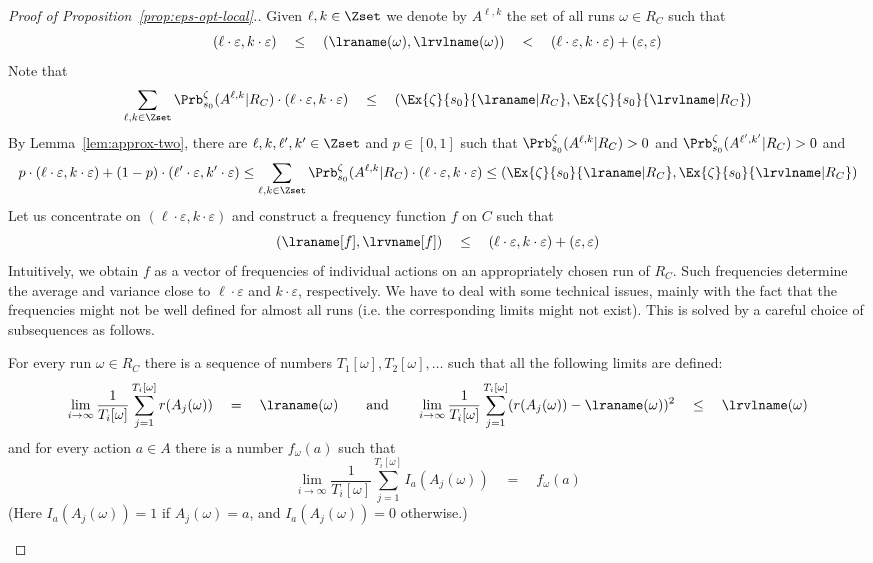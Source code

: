 \medskip\noindent
\begin{proof}[Proof of Proposition~\ref{prop:eps-opt-local}.]
Given $\ell,k\in \Zset$ we denote by $A^{\ell,k}$ the set of all runs $\omega\in R_C$ such that
\[
(\ell\cdot \varepsilon,k\cdot \varepsilon) \quad \leq \quad (\lraname(\omega),\lrvlname(\omega))\quad < \quad (\ell\cdot \varepsilon,k\cdot \varepsilon)+(\varepsilon,\varepsilon)
\]
Note that 
\[
\sum_{\ell,k\in \Zset} \Prb_{s_0}^{\zeta}(A^{\ell,k}|R_C)\cdot (\ell\cdot \varepsilon,k\cdot \varepsilon) \quad \leq \quad
(\Ex{\zeta}{s_0}{\lraname|R_C}, \Ex{\zeta}{s_0}{\lrvlname|R_C})
\]
By Lemma~\ref{lem:approx-two}, there are $\ell,k,\ell',k'\in \Zset$ and $p\in [0,1]$ such that $\Prb_{s_0}^{\zeta}(A^{\ell,k}|R_C)>0$ and $\Prb_{s_0}^{\zeta}(A^{\ell',k'}|R_C)>0$ and 
\begin{equation}\label{eq:approx-two}
p\cdot (\ell\cdot \varepsilon,k\cdot \varepsilon)+(1-p)\cdot (\ell'\cdot \varepsilon,k'\cdot \varepsilon)\leq \sum_{\ell,k\in \Zset} \Prb_{s_0}^{\zeta}(A^{\ell,k}|R_C)\cdot (\ell\cdot \varepsilon,k\cdot \varepsilon)\leq
(\Ex{\zeta}{s_0}{\lraname|R_C}, \Ex{\zeta}{s_0}{\lrvlname|R_C})
\end{equation}
Let us concentrate on $(\ell\cdot \varepsilon,k\cdot \varepsilon)$ and construct a frequency function $f$ on $C$ such that
\[
 (\lraname[f],\lrvname[f])
\quad \leq \quad (\ell\cdot \varepsilon,k\cdot \varepsilon)+(\varepsilon,\varepsilon)
\]
Intuitively, we obtain $f$ as a vector of frequencies of individual actions on an appropriately chosen run of $R_C$. Such frequencies determine the average and variance close to $\ell\cdot \varepsilon$ and $k\cdot \varepsilon$, respectively. We have to deal with some technical issues, mainly with the fact that the frequencies might not be well defined for almost all runs (i.e. the corresponding limits might not exist). This is solved by a careful choice of subsequences as follows.
\begin{claim}\label{claim:subsequence-local}
For every run $\omega\in R_C$ there is a sequence of numbers $T_1[\omega],T_2[\omega],\ldots$ such that
all the following limits are defined:
\[
\lim_{i\rightarrow \infty} \frac{1}{T_i[\omega]} \sum_{j=1}^{T_i[\omega]} r(A_j(\omega))\quad = \quad \lraname(\omega)
\qquad
\text{and}
\qquad
\lim_{i\rightarrow \infty} \frac{1}{T_i[\omega]} \sum_{j=1}^{T_i[\omega]} (r(A_j(\omega))-\lraname(\omega))^2\quad \le \quad \lrvlname(\omega)
\]
and for every action $a\in A$ there is a number $f_{\omega}(a)$ such that
\[
\lim_{i\rightarrow \infty} \frac{1}{T_i[\omega]} \sum_{j=1}^{T_i[\omega]} I_a(A_j(\omega))\quad = \quad f_{\omega}(a)
\]
(Here $I_a(A_j(\omega))=1$ if $A_j(\omega)=a$, and $I_a(A_j(\omega))=0$ otherwise.)


\end{claim}
\end{proof}
